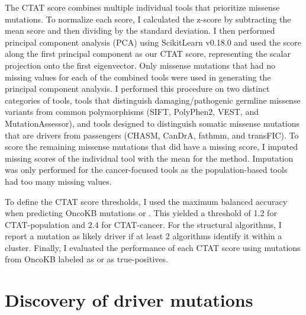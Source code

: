 The CTAT score combines multiple individual tools that prioritize missense mutations. To normalize each score, I calculated the z-score by subtracting the mean score and then dividing by the standard deviation. I then performed principal component analysis (PCA) using ScikitLearn v0.18.0 and used the score along the first principal component as our CTAT score, representing the scalar projection onto the first eigenvector. Only missense mutations that had no missing values for each of the combined tools were used in generating the principal component analysis. I performed this procedure on two distinct categories of tools,  tools that distinguish damaging/pathogenic germline missense variants from common polymorphisms (SIFT, PolyPhen2, VEST, and MutationAssessor), and  tools designed to distinguish somatic missense mutations that are drivers from passengers (CHASM, CanDrA, fathmm, and transFIC). To score the remaining missense mutations that did have a missing score, I imputed missing scores of the individual tool with the mean for the method. Imputation was only performed for the cancer-focused tools as the population-based tools had too many missing values.

To define the CTAT score thresholds, I used the maximum balanced accuracy when predicting OncoKB mutations  or . This yielded a threshold of 1.2 for CTAT-population and 2.4 for CTAT-cancer. For the structural algorithms, I report a mutation as likely driver if at least 2 algorithms identify it within a cluster. Finally, I evaluated the performance of each CTAT score using mutations from OncoKB labeled as  or  as true-positives. 

\section{Discovery of driver mutations}

